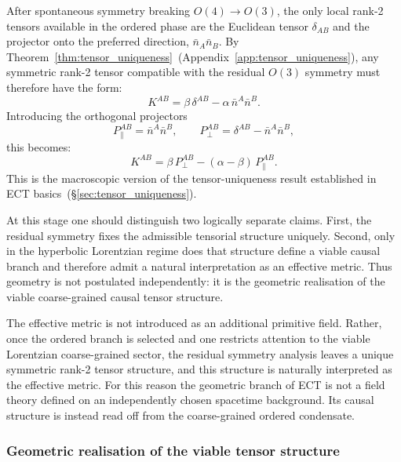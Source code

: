 \documentclass[11pt,a4paper]{article}
\numberwithin{equation}{section}
\begin{document}
After spontaneous symmetry breaking $O(4)\to O(3)$, the only local
rank-2 tensors available in the ordered phase are the Euclidean tensor
$\delta_{AB}$ and the projector onto the preferred direction,
$\bar{n}_A\bar{n}_B$.
By Theorem~\ref{thm:tensor_uniqueness}~(Appendix~\ref{app:tensor_uniqueness}),
any symmetric rank-2 tensor compatible with the residual $O(3)$ symmetry
must therefore have the form:
\begin{equation}
  \label{eq:K_macro}
  K^{AB}
  = \beta\,\delta^{AB} - \alpha\,\bar{n}^A\bar{n}^B.
\end{equation}
Introducing the orthogonal projectors
\begin{equation}
  \label{eq:projectors_macro}
  P_\parallel^{AB} = \bar{n}^A\bar{n}^B,
  \qquad
  P_\perp^{AB} = \delta^{AB} - \bar{n}^A\bar{n}^B,
\end{equation}
this becomes:
\begin{equation}
  \label{eq:K_macro_projector}
  K^{AB}
  = \beta\,P_\perp^{AB} - (\alpha-\beta)\,P_\parallel^{AB}.
\end{equation}
This is the macroscopic version of the tensor-uniqueness result
established in ECT basics~(\S\ref{sec:tensor_uniqueness}).

At this stage one should distinguish two logically separate claims.
First, the residual symmetry fixes the admissible tensorial structure
uniquely. Second, only in the hyperbolic Lorentzian regime does that
structure define a viable causal branch and therefore admit a natural
interpretation as an effective metric.
Thus geometry is not postulated independently: it is the geometric
realisation of the viable coarse-grained causal tensor structure.

The effective metric is not introduced as an additional primitive field.
Rather, once the ordered branch is selected and one restricts attention
to the viable Lorentzian coarse-grained sector, the residual symmetry
analysis leaves a unique symmetric rank-2 tensor structure, and this
structure is naturally interpreted as the effective metric.
For this reason the geometric branch of ECT is not a field theory
defined on an independently chosen spacetime background. Its causal
structure is instead read off from the coarse-grained ordered condensate.

\subsubsection*{Geometric realisation of the viable tensor structure}
\end{document}
